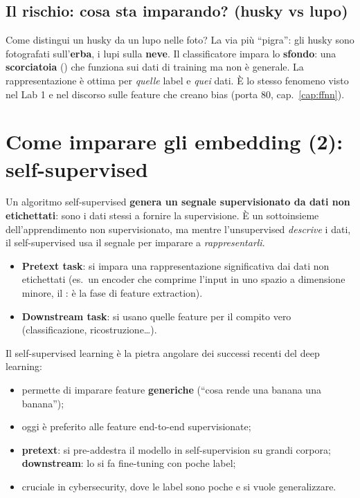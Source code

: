 \subsection{Il rischio: cosa sta imparando? (husky vs lupo)}
Come distingui un husky da un lupo nelle foto? La via più ``pigra'': gli husky sono fotografati sull'\textbf{erba}, i lupi sulla \textbf{neve}.
Il classificatore impara lo \textbf{sfondo}: una \textbf{scorciatoia} () che funziona sui dati di training ma non è generale.
La rappresentazione è ottima per \emph{quelle} label e \emph{quei} dati. È lo stesso fenomeno visto nel Lab 1 e nel discorso sulle feature che
creano bias (porta 80, cap.~\ref{cap:ffnn}).

\section{Come imparare gli embedding (2): self-supervised}
\begin{definizione}
Un algoritmo self-supervised \textbf{genera un segnale supervisionato da dati non etichettati}: sono i dati stessi a fornire la supervisione.
È un sottoinsieme dell'apprendimento non supervisionato, ma mentre l'unsupervised \emph{descrive} i dati, il self-supervised usa il segnale
per imparare a \emph{rappresentarli}.
\begin{itemize}
  \item \textbf{Pretext task}: si impara una rappresentazione significativa dai dati non etichettati (es.\ un encoder che comprime l'input
        in uno spazio a dimensione minore, il : è la fase di feature extraction).
  \item \textbf{Downstream task}: si usano quelle feature per il compito vero (classificazione, ricostruzione\ldots).
\end{itemize}
\end{definizione}
Il self-supervised learning è la pietra angolare dei successi recenti del deep learning:
\begin{itemize}
  \item permette di imparare feature \textbf{generiche} (``cosa rende una banana una banana'');
  \item oggi è preferito alle feature end-to-end supervisionate;
  \item \textbf{pretext}: si pre-addestra il modello in self-supervision su grandi corpora;
        \textbf{downstream}: lo si fa fine-tuning con poche label;
  \item cruciale in cybersecurity, dove le label sono poche e si vuole generalizzare.
\end{itemize}

